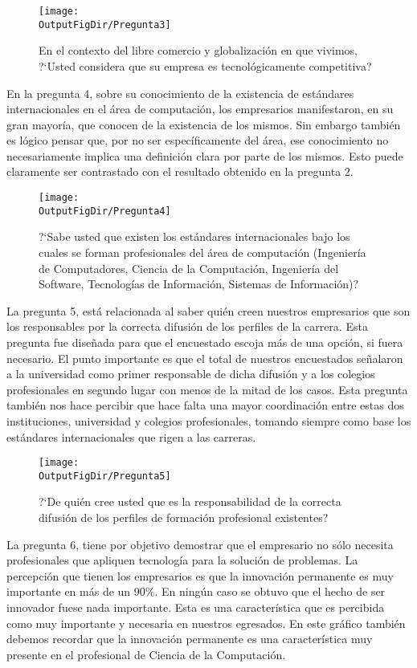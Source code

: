 \begin{figure}[!h]
	\centering
	\texttt{[image: \\OutputFigDir/Pregunta3]}
	\label{fig:Preg3}
	\caption{En el contexto del libre comercio y globalización en que vivimos, ?`Usted considera que su empresa es tecnológicamente competitiva?}
\end{figure}

En la pregunta 4, sobre su conocimiento de la existencia de estándares internacionales en el área de computación, los empresarios manifestaron, en su gran mayoría, que conocen de la existencia de los mismos. Sin embargo también es lógico pensar que, por no ser específicamente del área, ese conocimiento no necesariamente implica una definición clara por parte de los mismos. Esto puede claramente ser contrastado con el resultado obtenido en la pregunta 2.


\begin{figure}[!h]
	\centering
	\texttt{[image: \\OutputFigDir/Pregunta4]}
	\label{fig:Preg4}
	\caption{?`Sabe usted que existen los estándares internacionales bajo los cuales se forman profesionales del área de computación (Ingeniería de Computadores, Ciencia de la Computación, Ingeniería del Software, Tecnologías de Información, Sistemas de Información)?}
\end{figure}

La pregunta 5, está relacionada al saber quién creen nuestros empresarios que son los responsables por la correcta difusión de los perfiles de la carrera. Esta pregunta fue diseñada para que el encuestado escoja más de una opción, si fuera necesario. El punto importante es que el total de nuestros encuestados señalaron a la universidad como primer responsable de dicha difusión y a los colegios profesionales en segundo lugar con menos de la mitad de los casos. Esta pregunta también nos hace percibir que hace falta una mayor coordinación entre estas dos instituciones, universidad y colegios profesionales, tomando siempre como base los estándares internacionales que rigen a las carreras.

\begin{figure}[!h]
	\centering
	\texttt{[image: \\OutputFigDir/Pregunta5]}
	\label{fig:Preg5}
	\caption{?`De quién cree usted que es la responsabilidad de la correcta difusión de los perfiles de formación profesional existentes?}
\end{figure}

La pregunta 6, tiene por objetivo demostrar que el empresario no sólo necesita profesionales que apliquen tecnología para la solución de problemas. La percepción que tienen los empresarios es que la innovación permanente es muy importante en más de un 90\%. En ningún caso se obtuvo que el hecho de ser innovador fuese nada importante. Esta es una característica que es percibida como muy importante y necesaria en nuestros egresados. En este gráfico también debemos recordar que la innovación permanente es una característica muy presente en el profesional de Ciencia de la Computación.

